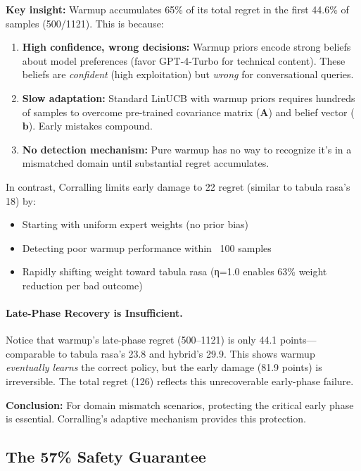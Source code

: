 \textbf{Key insight:} Warmup accumulates 65\% of its total regret in the first 44.6\% of samples (500/1121). This is because:
\begin{enumerate}[leftmargin=*,nosep]
    \item \textbf{High confidence, wrong decisions:} Warmup priors encode strong beliefs about model preferences (favor GPT-4-Turbo for technical content). These beliefs are \emph{confident} (high exploitation) but \emph{wrong} for conversational queries.
    \item \textbf{Slow adaptation:} Standard LinUCB with warmup priors requires hundreds of samples to overcome pre-trained covariance matrix ($\mathbf{A}$) and belief vector ($\mathbf{b}$). Early mistakes compound.
    \item \textbf{No detection mechanism:} Pure warmup has no way to recognize it's in a mismatched domain until substantial regret accumulates.
\end{enumerate}

In contrast, Corralling limits early damage to 22 regret (similar to tabula rasa's 18) by:
\begin{itemize}[leftmargin=*,nosep]
    \item Starting with uniform expert weights (no prior bias)
    \item Detecting poor warmup performance within ~100 samples
    \item Rapidly shifting weight toward tabula rasa (η=1.0 enables 63\% weight reduction per bad outcome)
\end{itemize}

\paragraph{Late-Phase Recovery is Insufficient.}
Notice that warmup's late-phase regret (500--1121) is only 44.1 points—comparable to tabula rasa's 23.8 and hybrid's 29.9. This shows warmup \emph{eventually learns} the correct policy, but the early damage (81.9 points) is irreversible. The total regret (126) reflects this unrecoverable early-phase failure.

\textbf{Conclusion:} For domain mismatch scenarios, protecting the critical early phase is essential. Corralling's adaptive mechanism provides this protection.

\subsection{The 57\% Safety Guarantee}

